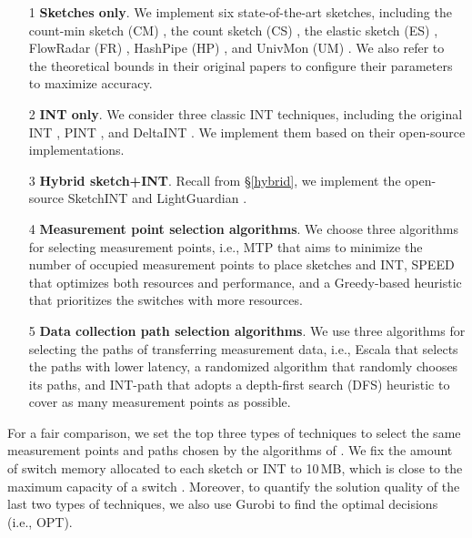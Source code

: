 \begin{itemize}[leftmargin=*]
%
    \item[1] \textbf{Sketches only}. We implement six state-of-the-art sketches, including the count-min sketch (CM) \cite{cormode2005improved}, the count sketch (CS) \cite{charikar2004finding}, the elastic sketch (ES) \cite{yang2018elastic}, FlowRadar (FR) \cite{li2016flowradar}, HashPipe (HP) \cite{sivaraman2017heavy}, and UnivMon (UM) \cite{liu2016one}. We also refer to the theoretical bounds in their original papers to configure their parameters to maximize accuracy. %
%
    \item[2] \textbf{INT only}. We consider three classic INT techniques, including the original INT \cite{int}, PINT \cite{ben2020pint}, and DeltaINT \cite{sheng2021deltaint}. We implement them based on their open-source implementations. %
%
    \item[3] \textbf{Hybrid sketch+INT}. Recall from \S\ref{hybrid}, we implement the open-source SketchINT \cite{yang2023sketchint} and LightGuardian \cite{zhao2021lightguardian}. 
%
    \item[4] \textbf{Measurement point selection algorithms}. We choose three algorithms for selecting measurement points, i.e., MTP \cite{chen2021mtp} that aims to minimize the number of occupied measurement points to place sketches and INT, SPEED \cite{chen2020speed} that optimizes both resources and performance, and a Greedy-based heuristic that prioritizes the switches with more resources. 
%
    \item[5] \textbf{Data collection path selection algorithms}. We use three algorithms for selecting the paths of transferring measurement data, i.e., Escala \cite{liu2022escala} that selects the paths with lower latency, a randomized algorithm that randomly chooses its paths, and INT-path \cite{pan2019int} that adopts a depth-first search (DFS) heuristic to cover as many measurement points as possible.
%
\end{itemize}

For a fair comparison, we set the top three types of techniques to select the same measurement points and paths chosen by the algorithms of \sysname. We fix the amount of switch memory allocated to each sketch or INT to 10\,MB, which is close to the maximum capacity of a switch \cite{gupta2018sonata}. 
Moreover, to quantify the solution quality of the last two types of techniques, we also use Gurobi \cite{gurobi} to find the optimal decisions (i.e., OPT). 

